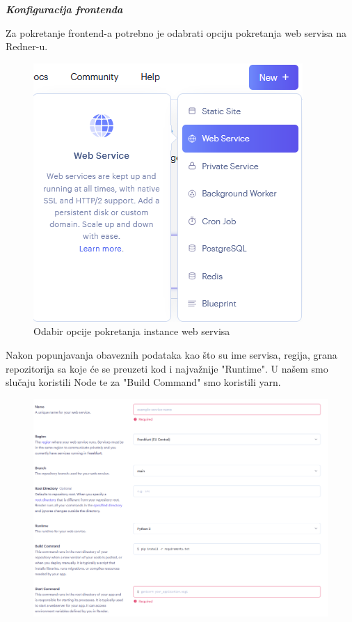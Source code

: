 			\break
			
			\textbf{\textit{Konfiguracija frontenda}}
			
				Za pokretanje frontend-a potrebno je odabrati opciju pokretanja web servisa na Redner-u.
				\begin{figure}[H]
					\centering
					\includegraphics[width=\textwidth]{slike/render_web_service.png}
					\caption{Odabir opcije pokretanja instance web servisa}
					\label{fig: Render web service instance front}
				\end{figure}
				Nakon popunjavanja obaveznih podataka kao što su ime servisa, regija, grana repozitorija sa koje će se preuzeti kod i najvažnije "Runtime". U našem smo slučaju koristili Node te za "Build Command" smo koristili yarn.
				\begin{figure}[H]
					\centering
					\includegraphics[width=\textwidth]{slike/create_web_service_part1.png}
					\label{fig: Render create web service part 1 front}
				\end{figure}
